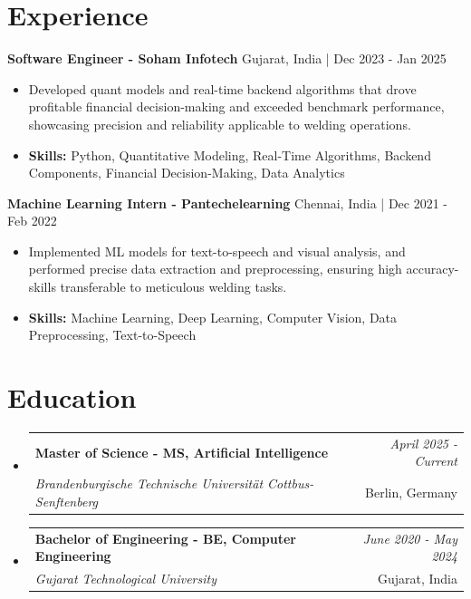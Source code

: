 \documentclass[a4paper,11pt]{article}
\makeatletter
\newcommand{\resumeSubheading}[4]{
\vspace{0.5mm}\item
    \begin{tabular*}{\linewidth}[t]{l@{\extracolsep{\fill}}r}
        \textbf{#1} & \textit{\footnotesize{#4}} \\
        \textit{\footnotesize{#3}} &  \footnotesize{#2}\\
    \end{tabular*}
    \vspace{-2.4mm}
}
\makeatother
\begin{document}
\section{\textbf{Experience}}


\vspace{1mm}
  \textbf{Software Engineer - Soham Infotech} \hfill Gujarat, India | Dec 2023 - Jan 2025
\vspace{-1.5mm} %
\begin{itemize}
  \item Developed quant models and real-time backend algorithms that drove profitable financial decision-making and exceeded benchmark performance, showcasing precision and reliability applicable to welding operations.

\vspace{-2mm}
  \item \textbf{Skills:} Python, Quantitative Modeling, Real-Time Algorithms, Backend Components, Financial Decision-Making, Data Analytics
\end{itemize}

\vspace{1mm}
  \textbf{Machine Learning Intern - Pantechelearning} \hfill Chennai, India | Dec 2021 - Feb 2022
\vspace{-1.5mm} %
\begin{itemize}
  \item Implemented ML models for text-to-speech and visual analysis, and performed precise data extraction and preprocessing, ensuring high accuracy-skills transferable to meticulous welding tasks.
\vspace{-2mm}
  \item \textbf{Skills:} Machine Learning, Deep Learning, Computer Vision, Data Preprocessing, Text-to-Speech
\end{itemize}\section{\textbf{Education}}
\vspace{-0.4mm}

\begin{itemize}[leftmargin=0.15in, label={}]
\resumeSubheading
{Master of Science - MS, Artificial Intelligence }{Berlin, Germany}
{Brandenburgische Technische Universität Cottbus-Senftenberg  }{April 2025 - Current}

\vspace{1.0mm} %
\resumeSubheading
{Bachelor of Engineering - BE, Computer Engineering  }{Gujarat, India}
{Gujarat Technological University }{June 2020 - May 2024}

\end{itemize}
\end{document}

